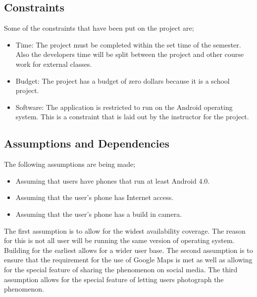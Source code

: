 \documentclass[]{article}
\begin{document}
\subsection{Constraints}

\label{sub:constraints}
Some of the constraints that have been put on the project are;
\begin{itemize}
	\item Time: The project must be completed within the set time of the semester. Also the developers time will be split between the project and other course work for external classes. 
	\item Budget: The project has a budget of zero dollars because it is a school project. 
	\item Software: The application is restricted to run on the Android operating system. This is a constraint that is laid out by the instructor for the project. 
\end{itemize}

\subsection{Assumptions and Dependencies}
\label{sub:assumptions_and_dependencies}
The following assumptions are being made;
\begin{itemize}
	\item Assuming that users have phones that run at least Android 4.0.  
	\item Assuming that the user's phone has Internet access. 
	\item Assuming that the user's phone has a build in camera. 
\end{itemize}
The first assumption is to allow for the widest availability coverage. The reason for this is not all user will be running the same version of operating system. Building for the earliest allows for a wider user base. The second assumption is to ensure that the requirement for the use of Google Maps is met as well as allowing for the special feature of sharing the phenomenon on social media. The third assumption allows for the special feature of letting users photograph the phenomenon. 

\end{document}
